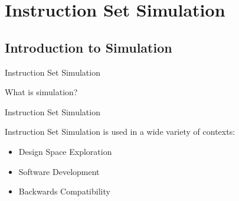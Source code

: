 \section{Instruction Set Simulation}

\subsection{Introduction to Simulation}

\begin{frame}[t]{Instruction Set Simulation}

What is simulation? 

\end{frame}

\begin{frame}[t]{Instruction Set Simulation}
\vspace{0pt}
\begin{minipage}{\textwidth}
	\vspace{0pt}
	Instruction Set Simulation is used in a wide variety of contexts:
	\begin{itemize}
		\item<2-> Design Space Exploration
		\item<3-> Software Development 
		\item<4-> Backwards Compatibility
	\end{itemize}
\end{minipage}

\bigskip


\end{frame}
